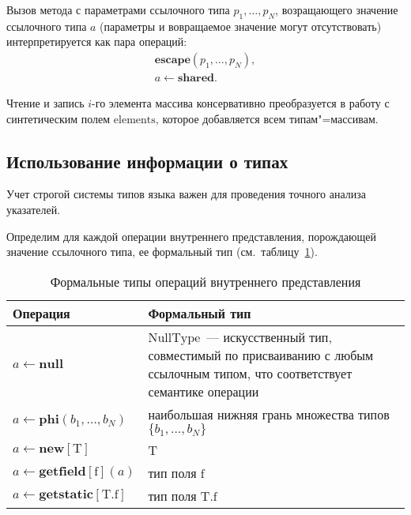 \documentclass[14pt,titlepage,draft]{extarticle}
\newcommand{\java}{\eng{Java}\xspace}
\newcommand{\type}[1]{\mathrm{#1}}
\newcommand{\field}[1]{\mathrm{#1}}
\newcommand{\sfield}[2]{\type{#1}.\field{#2}}
\newcommand{\op}[1]{\mathbf{#1}}
\begin{document}
    Вызов метода с параметрами ссылочного типа $p_1, \ldots, p_N$, возращающего
    значение ссылочного типа $a$ (параметры и вовращаемое значение могут
    отсутствовать) интерпретируется как пара операций:
    \begin{gather*}
      \op{escape}(p_1, \ldots, p_N), \\
      a \gets \op{shared}.
    \end{gather*}

    Чтение и запись $i$-го элемента массива консервативно преобразуется в
    работу с синтетическим полем $\field{elements}$, которое добавляется всем
    типам"=массивам.

  \subsection{Использование информации о типах}

    Учет строгой системы типов языка \java важен для проведения точного анализа
    указателей.

    Определим для каждой операции внутреннего представления, порождающей
    значение ссылочного типа, ее формальный тип
    (см.~таблицу~\ref{tabular:ops_types}).

    \begin{table}[htb]
      \centering

      \begin{tabular}{|p{}|p{}|}\hline
        \textbf{Операция} &
          \textbf{Формальный тип}\\ \hline

        $a \gets \op{null}$
        & $\type{NullType}$~--- искусственный тип, совместимый по
          присваиванию с любым ссылочным типом, что соответствует
          семантике операции
        \\ \hline

        $a \gets \op{phi}(b_1, \ldots, b_N)$
        & наибольшая нижняя грань множества типов $\{b_1, \ldots, b_N\}$
        \\ \hline

        $a \gets \op{new}[\type{T}]$
        & T
        \\ \hline

        $a \gets \op{getfield}[\field{f}](a)$
        & тип поля $\field{f}$
        \\ \hline

        $a \gets \op{getstatic}[\sfield{T}{f}]$
        & тип поля $\sfield{T}{f}$
        \\ \hline

      \end{tabular}
      \caption{Формальные типы операций внутреннего представления}
      \label{tabular:ops_types}
    \end{table}
\end{document}

